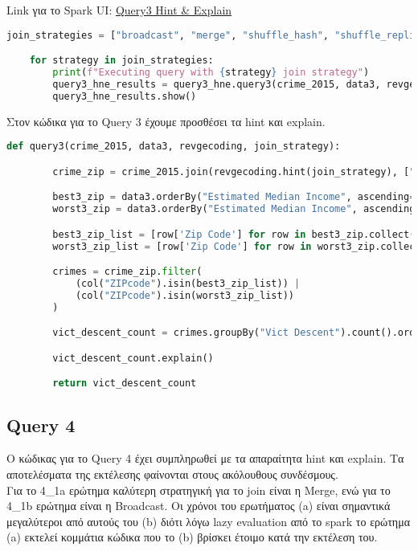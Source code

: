 \documentclass{article}
\begin{document}
\vspace{3\baselineskip}

Link για το Spark UI:
\href{http://83.212.81.191:18080/history/application_1705357398960_0018/jobs/} {Query3 Hint \& Explain}
\begin{lstlisting}[language = Python]
    join_strategies = ["broadcast", "merge", "shuffle_hash", "shuffle_replicate_nl"]

    for strategy in join_strategies:
        print(f"Executing query with {strategy} join strategy")
        query3_hne_results = query3_hne.query3(crime_2015, data3, revgecoding, strategy)
        query3_hne_results.show()
\end{lstlisting}

\vspace{1\baselineskip}

Στον κώδικα για το Query 3 έχουμε προσθέσει τα hint και explain.\\

\begin{lstlisting}[language = Python]
    def query3(crime_2015, data3, revgecoding, join_strategy):

        crime_zip = crime_2015.join(revgecoding.hint(join_strategy), ["LAT", "LON"], "left")

        best3_zip = data3.orderBy("Estimated Median Income", ascending=False).limit(3)
        worst3_zip = data3.orderBy("Estimated Median Income", ascending=True).limit(3)

        best3_zip_list = [row['Zip Code'] for row in best3_zip.collect()]
        worst3_zip_list = [row['Zip Code'] for row in worst3_zip.collect()]

        crimes = crime_zip.filter(
            (col("ZIPcode").isin(best3_zip_list)) |
            (col("ZIPcode").isin(worst3_zip_list))
        )

        vict_descent_count = crimes.groupBy("Vict Descent").count().orderBy("count", ascending=False)

        vict_descent_count.explain()

        return vict_descent_count
\end{lstlisting}


\subsection*{Query 4}

Ο κώδικας για το Query 4 έχει συμπληρωθεί με τα απαραίτητα hint και explain. 
Τα αποτελέσματα της εκτέλεσης φαίνονται στους ακόλουθους συνδέσμους. \\
Για το 4\_1a ερώτημα καλύτερη στρατηγική για το join είναι η Merge, ενώ για το 4\_1b ερώτημα 
είναι η Broadcast. Οι χρόνοι του ερωτήματος (a) είναι σημαντικά μεγαλύτεροι από αυτούς του 
(b) διότι λόγω lazy evaluation από το spark το ερώτημα (a) εκτελεί κομμάτια κώδικα που το (b) 
βρίσκει έτοιμο κατά την εκτέλεση του.\\
\end{document}
